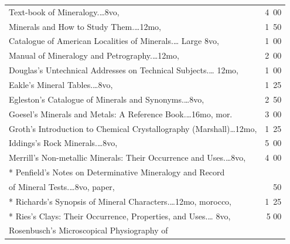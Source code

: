 \documentclass[a4paper,12pt]{book}[2004/02/16]
\theoremstyle{ilemma}
\theoremstyle{itheorem}
\theoremstyle{iother}
\theoremstyle{icorollary}
\theoremstyle{numcorollary}
\theoremstyle{idefinition}
\begin{document}
\begin{longtable}{@{}l@{ }r@{}}
\indent Text-book of Mineralogy.\dotfill\ldots 8vo, & 4\ 00\\

\indent Minerals and How to Study Them.\dotfill\ldots 12mo, & 1\ 50\\

\indent Catalogue of American Localities of Minerals.\dotfill\ldots
Large 8vo, & 1\ 00\\

\indent Manual of Mineralogy and Petrography.\dotfill\ldots 12mo, & 2\ 00\\

Douglas's Untechnical Addresses on Technical Subjects.\dotfill\ldots
12mo, & 1\ 00\\

Eakle's Mineral Tables.\dotfill\ldots 8vo, & 1\ 25\\

Egleston's Catalogue of Minerals and Synonyms.\dotfill\ldots 8vo, & 2\ 50\\

Goesel's Minerals and Metals: A Reference Book.\dotfill\ldots 16mo,
mor. & 3\ 00\\

Groth's Introduction to Chemical Crystallography
(Marshall)\dotfill\ldots 12mo, & 1\ 25\\



Iddings's Rock Minerals.\dotfill\ldots 8vo, & 5\ 00\\

Merrill's Non-metallic Minerals: Their Occurrence and
Uses.\dotfill\ldots 8vo, & 4\ 00\\

* Penfield's Notes on Determinative Mineralogy and Record\\

\nopagebreak

\indent\indent of Mineral Tests.\dotfill\ldots 8vo, paper, & \ 50\\

* Richards's Synopsis of Mineral Characters.\dotfill\ldots 12mo,
  morocco, & 1\ 25\\

* Ries's Clays: Their Occurrence, Properties, and Uses.\dotfill\ldots
  8vo, & 5 00 \\

Rosenbusch's Microscopical Physiography of\\


\end{longtable}
\end{document}
